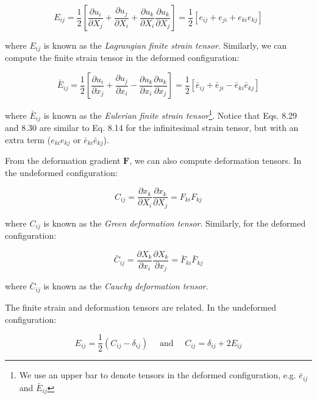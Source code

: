 \documentclass[a4paper , 12pt]{book}
\begin{document}
\begin{equation}
    E_{i j}=\frac{1}{2}\left[\frac{\partial u_{i}}{\partial X_{j}}+\frac{\partial u_{j}}{\partial X_{i}}+\frac{\partial u_{k}}{\partial X_{i}} \frac{\partial u_{k}}{\partial X_{j}}\right]=\frac{1}{2}\left[e_{i j}+e_{j i}+e_{k i} e_{k j}\right]
\end{equation}

where $E_{ij}$ is known as the \textit{Lagrangian finite strain tensor}. Similarly, we can compute the finite strain tensor in the deformed configuration:

\begin{equation}
    \bar{E}_{i j}=\frac{1}{2}\left[\frac{\partial u_{i}}{\partial x_{j}}+\frac{\partial u_{j}}{\partial x_{i}}-\frac{\partial u_{k}}{\partial x_{i}} \frac{\partial u_{k}}{\partial x_{j}}\right]=\frac{1}{2}\left[\bar{e}_{i j}+\bar{e}_{j i}-\bar{e}_{k i} \bar{e}_{k j}\right]
\end{equation}

where $\bar{E}_{i j}$ is known as the \textit{Eulerian finite strain tensor}\footnote{We use an upper bar to denote tensors in the deformed configuration, e.g. $\bar{e}_{ij}$ and $\bar{E}_{ij}$}. Notice that Eqs. 8.29 and 8.30 are similar to Eq. 8.14 for the infinitesimal strain tensor, but with an extra term ($e_{k i} e_{k j}$ or $\bar{e}_{k i} \bar{e}_{k j}$).

From the deformation gradient $\mathbf{F}$, we can also compute deformation tensors. In the undeformed configuration:

\begin{equation}
    C_{i j}=\frac{\partial x_{k}}{\partial X_{i}} \frac{\partial x_{k}}{\partial X_{j}}=F_{k i} F_{k j}
\end{equation}

where $C_{ij}$ is known as the \textit{Green deformation tensor}. Similarly, for the deformed configuration:

\begin{equation}
    \bar{C}_{i j}=\frac{\partial X_{k}}{\partial x_{i}} \frac{\partial X_{k}}{\partial x_{j}}=\bar{F}_{k i} \bar{F}_{k j}
\end{equation}

where $\bar{C}_{i j}$ is known as the \textit{Cauchy deformation tensor}.

The finite strain and deformation tensors are related. In the undeformed configuration:

\begin{equation}
    E_{i j}=\frac{1}{2}\left(C_{i j}-\delta_{i j}\right) \quad \text { and } \quad C_{i j}=\delta_{i j}+2 E_{i j}
\end{equation}
\end{document}
